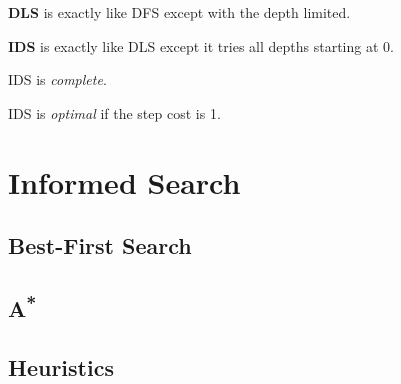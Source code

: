 \documentclass{article}
\begin{document}
    \textbf{DLS} is exactly like DFS except with the depth limited.

    \textbf{IDS} is exactly like DLS except it tries all depths starting at 0.
    
    IDS is \textit{complete}.
    
    IDS is \textit{optimal} if the step cost is 1.
    
    \section{Informed Search}

    \subsection{Best-First Search}

    \subsection{A\texorpdfstring{\textsuperscript{*}}{ Star}}

    \subsection{Heuristics}
\end{document}
